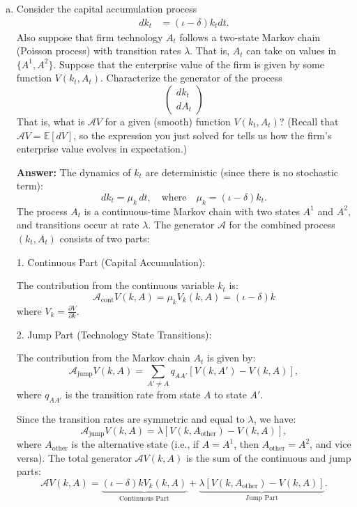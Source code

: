 \documentclass[11pt]{extarticle}
\theoremstyle{plain}
\theoremstyle{definition}
\begin{document}
\begin{enumerate}[(a)]
\item Consider the capital accumulation process
\begin{align*}
	dk_t &= (\iota - \delta) k_t dt. 
\end{align*}
Also suppose that firm technology $A_t$ follows a two-state Markov chain (Poisson process) with transition rates $\lambda$. That is, $A_t$ can take on values in $\{A^1, A^2\}$. Suppose that the enterprise value of the firm is given by some function $V(k_t, A_t)$. Characterize the generator of the process
\begin{equation*}
	\begin{pmatrix}
		d k_t \\
		d A_t 
	\end{pmatrix}
\end{equation*}
That is, what is $\mathcal A V$ for a given (smooth) function $V(k_t, A_t)$? (Recall that $\mathcal A V = \mathbb E[d V]$, so the expression you just solved for tells us how the firm's enterprise value evolves in expectation.)

\textbf{Answer:}    The dynamics of \( k_t \) are deterministic (since there is no stochastic term):
   \[
   dk_t = \mu_k \, dt, \quad \text{where} \quad \mu_k = (\iota - \delta) k_t.
   \]
The process \( A_t \) is a continuous-time Markov chain with two states \( A^1 \) and \( A^2 \), and transitions occur at rate \( \lambda \). The generator \( \mathcal{A} \) for the combined process \( (k_t, A_t) \) consists of two parts:

1. Continuous Part (Capital Accumulation):

   The contribution from the continuous variable \( k_t \) is:
   \[
   \mathcal{A}_{\text{cont}} V(k, A) = \mu_k V_k(k, A) = (\iota - \delta) k
   \]
   where \( V_k = \frac{\partial V}{\partial k} \).

2. Jump Part (Technology State Transitions):

   The contribution from the Markov chain \( A_t \) is given by:
   \[
   \mathcal{A}_{\text{jump}} V(k, A) = \sum_{A' \neq A} q_{A A'} [V(k, A') - V(k, A)],
   \]
   where \( q_{A A'} \) is the transition rate from state \( A \) to state \( A' \).

   Since the transition rates are symmetric and equal to \( \lambda \), we have:
   \[
   \mathcal{A}_{\text{jump}} V(k, A) = \lambda [V(k, A_{\text{other}}) - V(k, A)],
   \]
   where \( A_{\text{other}} \) is the alternative state (i.e., if \( A = A^1 \), then \( A_{\text{other}} = A^2 \), and vice versa).
The total generator \( \mathcal{A} V(k, A) \) is the sum of the continuous and jump parts:
\[
\mathcal{A} V(k, A) = \underbrace{(\iota - \delta) k V_k(k, A)}_{\text{Continuous Part}} + \underbrace{\lambda [V(k, A_{\text{other}}) - V(k, A)]}_{\text{Jump Part}}.
\]

\end{enumerate}
\end{document}

